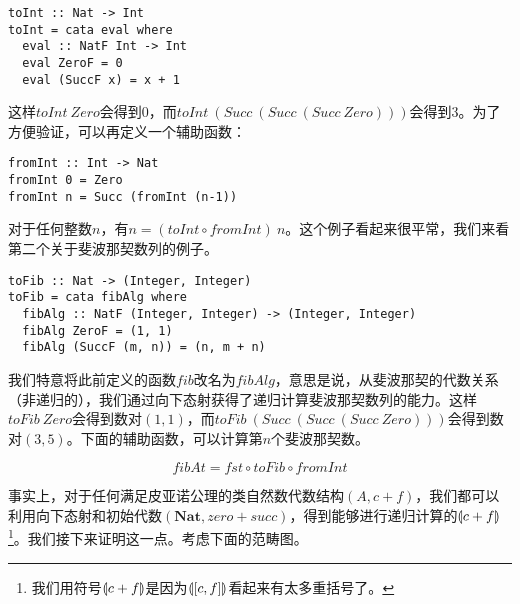 \documentclass{article}
\begin{document}
\lstset{frame=single}
\begin{lstlisting}[style=Haskell]
toInt :: Nat -> Int
toInt = cata eval where
  eval :: NatF Int -> Int
  eval ZeroF = 0
  eval (SuccF x) = x + 1
\end{lstlisting}

这样$toInt\ Zero$会得到0，而$toInt\ (Succ\ (Succ\ (Succ\ Zero)))$会得到3。为了方便验证，可以再定义一个辅助函数：

\begin{lstlisting}[style=Haskell]
fromInt :: Int -> Nat
fromInt 0 = Zero
fromInt n = Succ (fromInt (n-1))
\end{lstlisting}

对于任何整数$n$，有$n = (toInt \circ fromInt)\ n$。这个例子看起来很平常，我们来看第二个关于斐波那契数列的例子。

\begin{lstlisting}[style=Haskell]
toFib :: Nat -> (Integer, Integer)
toFib = cata fibAlg where
  fibAlg :: NatF (Integer, Integer) -> (Integer, Integer)
  fibAlg ZeroF = (1, 1)
  fibAlg (SuccF (m, n)) = (n, m + n)
\end{lstlisting}

我们特意将此前定义的函数$fib$改名为$fibAlg$，意思是说，从斐波那契的代数关系（非递归的），我们通过向下态射获得了递归计算斐波那契数列的能力。这样$toFib\ Zero$会得到数对$(1, 1)$，而$toFib\ (Succ\ (Succ\ (Succ\ Zero)))$会得到数对$(3, 5)$。下面的辅助函数，可以计算第$n$个斐波那契数。

\[
fibAt = fst \circ toFib \circ fromInt
\]

事实上，对于任何满足皮亚诺公理的类自然数代数结构$(A, c + f)$，我们都可以利用向下态射和初始代数$(\mathbf{Nat}, zero + succ)$，得到能够进行递归计算的$\llparenthesis c + f \rrparenthesis$\footnote{我们用符号$\llparenthesis c + f \rrparenthesis$是因为$\llparenthesis [c, f] \rrparenthesis$看起来有太多重括号了。}。我们接下来证明这一点。考虑下面的范畴图。

\begin{center}
\end{center}
\end{document}
